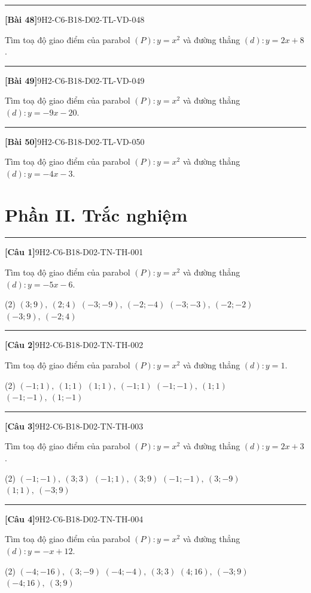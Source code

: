 \documentclass[12pt,a4paper]{article}
\newif\ifloigiai
\newenvironment{cauhoi}[2]{%
  \par\medskip\noindent\rule{\textwidth}{0.4pt}\par\nopagebreak
  \noindent\textbf{[#1]}\hfill{\scriptsize\ttfamily #2}\par\nopagebreak\smallskip}{\par}
\newcommand{\loigiai}[1]{\ifloigiai\par\smallskip\noindent\textit{Lời giải.} #1\par\fi}
\newcommand{\dapan}[1]{\ifloigiai\par\smallskip\noindent\textit{Đáp án:} \textbf{#1}\par\fi}
\begin{document}
\begin{cauhoi}{Bài 48}{9H2-C6-B18-D02-TL-VD-048}
Tìm toạ độ giao điểm của parabol $(P): y=x^{2}$ và đường thẳng $(d): y=2x+8$.
\loigiai{Phương trình hoành độ giao điểm: $x^{2}=2x+8$ hay $x^{2}-2x-8=0$, có hai nghiệm $x=-2$ và $x=4$. Giao điểm là $(-2;4)$ và $(4;16)$.}
\end{cauhoi}
\begin{cauhoi}{Bài 49}{9H2-C6-B18-D02-TL-VD-049}
Tìm toạ độ giao điểm của parabol $(P): y=x^{2}$ và đường thẳng $(d): y=-9x-20$.
\loigiai{Phương trình hoành độ giao điểm: $x^{2}=-9x-20$ hay $x^{2}+9x+20=0$, có hai nghiệm $x=-5$ và $x=-4$. Giao điểm là $(-5;25)$ và $(-4;16)$.}
\end{cauhoi}
\begin{cauhoi}{Bài 50}{9H2-C6-B18-D02-TL-VD-050}
Tìm toạ độ giao điểm của parabol $(P): y=x^{2}$ và đường thẳng $(d): y=-4x-3$.
\loigiai{Phương trình hoành độ giao điểm: $x^{2}=-4x-3$ hay $x^{2}+4x+3=0$, có hai nghiệm $x=-3$ và $x=-1$. Giao điểm là $(-3;9)$ và $(-1;1)$.}
\end{cauhoi}
\clearpage\section*{Phần II. Trắc nghiệm}
\begin{cauhoi}{Câu 1}{9H2-C6-B18-D02-TN-TH-001}
Tìm toạ độ giao điểm của parabol $(P): y=x^{2}$ và đường thẳng $(d): y=-5x-6$.
\begin{tasks}(2)
\task $(3;9),\ (2;4)$
\task $(-3;-9),\ (-2;-4)$
\task $(-3;-3),\ (-2;-2)$
\task $(-3;9),\ (-2;4)$
\end{tasks}
\dapan{D}
\end{cauhoi}
\begin{cauhoi}{Câu 2}{9H2-C6-B18-D02-TN-TH-002}
Tìm toạ độ giao điểm của parabol $(P): y=x^{2}$ và đường thẳng $(d): y=1$.
\begin{tasks}(2)
\task $(-1;1),\ (1;1)$
\task $(1;1),\ (-1;1)$
\task $(-1;-1),\ (1;1)$
\task $(-1;-1),\ (1;-1)$
\end{tasks}
\dapan{A}
\end{cauhoi}
\begin{cauhoi}{Câu 3}{9H2-C6-B18-D02-TN-TH-003}
Tìm toạ độ giao điểm của parabol $(P): y=x^{2}$ và đường thẳng $(d): y=2x+3$.
\begin{tasks}(2)
\task $(-1;-1),\ (3;3)$
\task $(-1;1),\ (3;9)$
\task $(-1;-1),\ (3;-9)$
\task $(1;1),\ (-3;9)$
\end{tasks}
\dapan{B}
\end{cauhoi}
\begin{cauhoi}{Câu 4}{9H2-C6-B18-D02-TN-TH-004}
Tìm toạ độ giao điểm của parabol $(P): y=x^{2}$ và đường thẳng $(d): y=-x+12$.
\begin{tasks}(2)
\task $(-4;-16),\ (3;-9)$
\task $(-4;-4),\ (3;3)$
\task $(4;16),\ (-3;9)$
\task $(-4;16),\ (3;9)$
\end{tasks}
\dapan{D}
\end{cauhoi}
\end{document}
